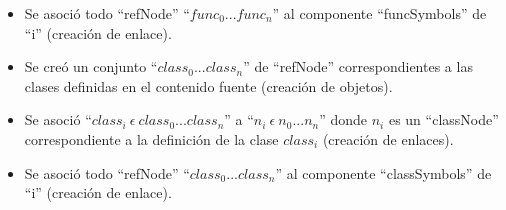 \begin{framed}
\begin{description}
\begin {itemize}
         \item Se asoció todo ``refNode'' ``$func_0...func_n$'' al componente ``funcSymbols'' de ``i'' (creación de enlace). 
         \item Se creó un conjunto ``$class_0...class_n$'' de ``refNode'' correspondientes a las clases definidas en el contenido fuente (creación de objetos).
         \item Se asoció ``$class_i\ \epsilon\ class_0...class_n$'' a  ``$n_i\ \epsilon\ n_0...n_n$'' donde $n_i$ es un ``classNode'' correspondiente a la definición de la clase $class_i$ (creación de enlaces).
         \item Se asoció todo ``refNode'' ``$class_0...class_n$'' al componente ``classSymbols'' de ``i'' (creación de enlace). 
      \end{itemize}
	\end{description}
\end{framed}
\FloatBarrier


